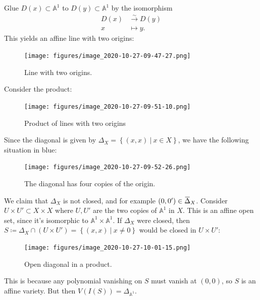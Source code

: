 \begin{example}

Glue \(D(x) \subset {\mathbb{A}}^1\) to \(D(y) \subset {\mathbb{A}}^1\)
by the isomorphism
\begin{align*}  
D(x) & \xrightarrow{\sim} D(y) \\
x &\mapsto y
.\end{align*}
This yields an affine line with two origins:

\begin{figure}
\centering
\texttt{[image: figures/image\_2020-10-27-09-47-27.png]}
\caption{Line with two origins.}
\end{figure}

Consider the product:

\begin{figure}
\centering
\texttt{[image: figures/image\_2020-10-27-09-51-10.png]}
\caption{Product of lines with two origins}
\end{figure}

Since the diagonal is given by
\(\Delta_X = \left\{{(x, x) {~\mathrel{\Big|}~}x\in X}\right\}\), we
have the following situation in blue:

\begin{figure}
\centering
\texttt{[image: figures/image\_2020-10-27-09-52-26.png]}
\caption{The diagonal has four copies of the origin.}
\end{figure}

We claim that \(\Delta_X\) is not closed, and for example
\((0, 0') \in \mkern 1.5mu\overline{\mkern-1.5mu\Delta\mkern-1.5mu}\mkern 1.5mu_X\).
Consider \(U\times U' \subset X\times X\) where \(U, U'\) are the two
copies of \({\mathbb{A}}^1\) in \(X\). This is an affine open set, since
it's isomorphic to \({\mathbb{A}}^1\times{\mathbb{A}}^1\). If
\(\Delta_X\) were closed, then
\(S \coloneqq\Delta_X \cap(U\times U') = \left\{{(x, x) {~\mathrel{\Big|}~}x\neq 0}\right\}\)
would be closed in \(U\times U'\):

\begin{figure}
\centering
\texttt{[image: figures/image\_2020-10-27-10-01-15.png]}
\caption{Open diagonal in a product.}
\end{figure}

This is because any polynomial vanishing on \(S\) must vanish at
\((0, 0)\), so \(S\) is an affine variety. But then
\(V(I(S)) = \Delta_{{\mathbb{A}}^1}\).

\end{example}

